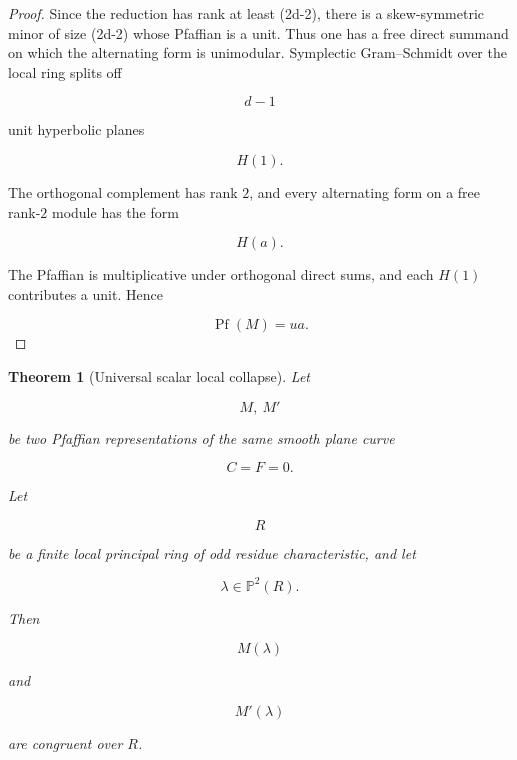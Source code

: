 \documentclass[11pt]{article}
\newtheorem{theorem}{Theorem}[section]
\begin{document}
\begin{proof}
Since the reduction has rank at least (2d-2), there is a skew-symmetric minor of size (2d-2) whose Pfaffian is a unit. Thus one has a free direct summand on which the alternating form is unimodular. Symplectic Gram--Schmidt over the local ring splits off

\[
d-1
\]

unit hyperbolic planes

\[
H(1).
\]

The orthogonal complement has rank $2$, and every alternating form on a free rank-$2$ module has the form

\[
H(a).
\]

The Pfaffian is multiplicative under orthogonal direct sums, and each $H(1)$ contributes a unit. Hence

\[
\operatorname{Pf}(M)=u a.
\]

\end{proof}

\begin{theorem}[Universal scalar local collapse]
Let

\[
M,\ M'
\]

be two Pfaffian representations of the same smooth plane curve

\[
C={F=0}.
\]

Let

\[
R
\]

be a finite local principal ring of odd residue characteristic, and let

\[
\lambda\in\mathbb P^2(R).
\]

Then

\[
M(\lambda)
\]

and

\[
M'(\lambda)
\]

are congruent over $R$.

\end{theorem}
\end{document}
